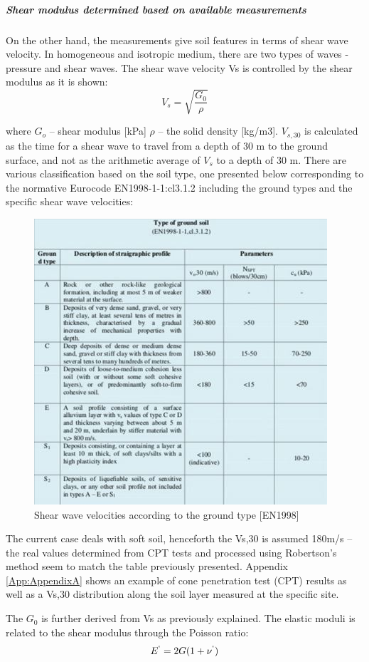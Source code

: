 \documentclass[12pt,a4paper]{report}
\begin{document}
\subparagraph{Shear modulus determined based on available measurements }
On the other hand, the measurements give soil features in terms of shear wave velocity. In homogeneous and isotropic medium, there are two types of waves - pressure and shear waves. The shear wave velocity Vs is controlled by the shear modulus as it is shown:
\begin{equation}
	V_s=\sqrt{\frac{G_0}{\rho}}
\end{equation}

where
$G_o$ – shear modulus [kPa]
$\rho$ – the solid density [kg/m3]. 
$V_{s,30}$ is calculated as the time for a shear wave to travel from a depth of 30 m to the ground surface, and not as the arithmetic average of $V_s$ to a depth of 30 m. There are various classification based on the soil type, one presented below corresponding to the normative Eurocode EN1998-1-1:cl3.1.2 including the ground types and the specific shear wave velocities:  
\begin{figure}[h!]
	\centering
	\includegraphics[width=0.7\linewidth]{"EC8"}
	\caption{Shear wave velocities according to the ground type [EN1998]}
	\label{EC8}
\end{figure}

The current case deals with soft soil, henceforth the Vs,30 is assumed 180m/s –the real values determined from CPT tests and processed using Robertson’s method seem to match the table previously presented. Appendix \ref{App:AppendixA} shows an example of cone penetration test (CPT) results as well as a Vs,30 distribution along the soil layer measured at the specific site. 

The $G_0$ is further derived from Vs as previously explained. The elastic moduli is related to the shear modulus through the Poisson ratio:
\begin{equation}
	E^`=2G(1+\nu^`)
\end{equation}
\end{document}
